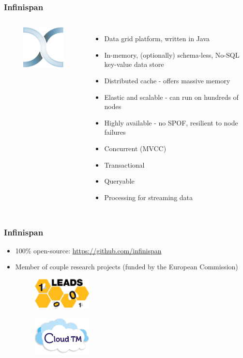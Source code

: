 \documentclass[10pt,utf8]{beamer}
\begin{document}
\begin{frame}
	\frametitle{Infinispan}
	\begin{columns}
		\begin{figure}
			\centering
			\includegraphics[width=3cm]{./img/infinispan.eps}
		\end{figure}
		\begin{itemize}
			\item Data grid platform, written in Java
			\item In-memory, (optionally) schema-less, No-SQL key-value data store
			\item Distributed cache - offers massive memory
			\item Elastic and scalable - can run on hundreds of nodes
			\item Highly available - no SPOF, resilient to node failures
			\item Concurrent (MVCC)
			\item Transactional
			\item Queryable
			\item Processing for streaming data
		\end{itemize}
	\end{columns}
\end{frame}

\begin{frame}
	\frametitle{Infinispan}
	\begin{itemize}
		\item 100\% open-source: \url{https://github.com/infinispan}
		\item Member of couple research projects (funded by the European Commission)
			\begin{figure}
				\centering
				\includegraphics[width=3cm]{./img/leads.eps}
			\end{figure}
			\vspace{0.5cm}
			\begin{figure}
				\centering
				\includegraphics[width=3cm]{./img/cloudTM.eps}
			\end{figure}
	\end{itemize}
\end{frame}
\end{document}
